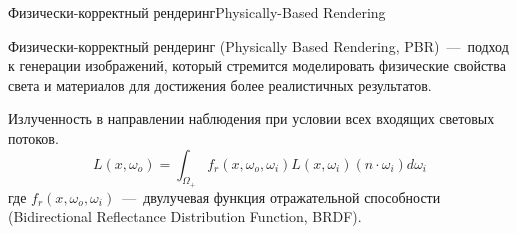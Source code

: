 \documentclass{beamer}
\begin{document}
		\begin{frame}{Физически-корректный рендеринг}{Physically-Based Rendering}
	
		Физически-корректный рендеринг (Physically Based Rendering, PBR)~---~подход к генерации изображений, который стремится моделировать физические свойства света и материалов для достижения более реалистичных результатов.

		Излученность в направлении наблюдения при условии всех входящих световых потоков. 
		\[
			L(x, \omega_o) 
			=
			\int_{\Omega_+} 
			f_r(x, \omega_o, \omega_i) 
			L(x, \omega_i) 
			(n \cdot \omega_i)
			d \omega_i
		\]
		где 
		$
			f_r(x, \omega_o, \omega_i) 
		$~---~двулучевая функция отражательной способности (Bidirectional Reflectance Distribution Function, BRDF).
		

	\end{frame}
\end{document}
